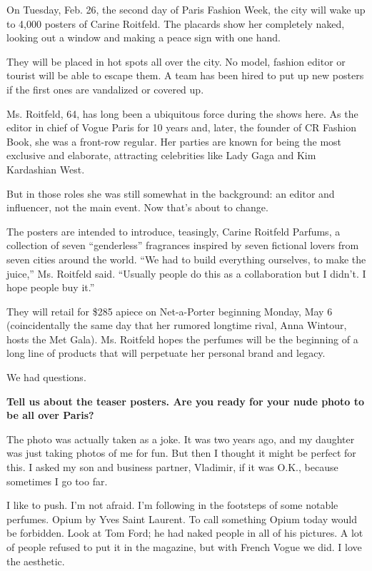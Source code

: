 On Tuesday, Feb. 26, the second day of Paris Fashion Week, the city will
wake up to 4,000 posters of Carine Roitfeld. The placards show her
completely naked, looking out a window and making a peace sign with one
hand.

They will be placed in hot spots all over the city. No model, fashion
editor or tourist will be able to escape them. A team has been hired to
put up new posters if the first ones are vandalized or covered up.

Ms. Roitfeld, 64, has long been a ubiquitous force during the shows
here. As the editor in chief of Vogue Paris for 10 years and, later, the
founder of CR Fashion Book, she was a front-row regular. Her parties are
known for being the most exclusive and elaborate, attracting celebrities
like Lady Gaga and Kim Kardashian West.

But in those roles she was still somewhat in the background: an editor
and influencer, not the main event. Now that's about to change.

The posters are intended to introduce, teasingly, Carine Roitfeld
Parfums, a collection of seven ``genderless'' fragrances inspired by
seven fictional lovers from seven cities around the world. ``We had to
build everything ourselves, to make the juice,'' Ms. Roitfeld said.
``Usually people do this as a collaboration but I didn't. I hope people
buy it.''

They will retail for \$285 apiece on Net-a-Porter beginning Monday, May
6 (coincidentally the same day that her rumored longtime rival, Anna
Wintour, hosts the Met Gala). Ms. Roitfeld hopes the perfumes will be
the beginning of a long line of products that will perpetuate her
personal brand and legacy.

We had questions.

\textbf{Tell us about the teaser posters. Are you ready for your nude
photo to be all over Paris?}

The photo was actually taken as a joke. It was two years ago, and my
daughter was just taking photos of me for fun. But then I thought it
might be perfect for this. I asked my son and business partner,
Vladimir, if it was O.K., because sometimes I go too far.

I like to push. I'm not afraid. I'm following in the footsteps of some
notable perfumes. Opium by Yves Saint Laurent. To call something Opium
today would be forbidden. Look at Tom Ford; he had naked people in all
of his pictures. A lot of people refused to put it in the magazine, but
with French Vogue we did. I love the aesthetic.

